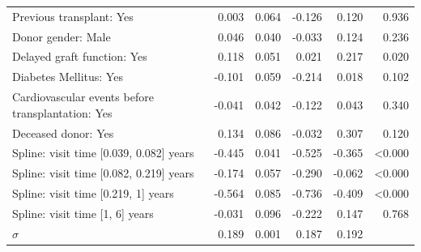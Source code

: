 \begin{table}[!htb]
\begin{center}
\begin{tabular}{lrrrrr}
Previous transplant: Yes                                                                 & 0.003    & 0.064 & -0.126 & 0.120   & 0.936 \\
Donor gender: Male                                                                       & 0.046    & 0.040  & -0.033 & 0.124  & 0.236 \\
Delayed graft function: Yes                                                                       & 0.118    & 0.051 & 0.021  & 0.217  & 0.020  \\
Diabetes Mellitus: Yes                                                                        & -0.101   & 0.059 & -0.214 & 0.018  & 0.102 \\
Cardiovascular events before transplantation: Yes                                                                     & -0.041   & 0.042 & -0.122 & 0.043  & 0.340  \\
Deceased donor: Yes                                                                 & 0.134    & 0.086 & -0.032 & 0.307  & 0.120  \\
Spline: visit time [0.039, 0.082] years & -0.445   & 0.041 & -0.525 & -0.365 & \textless0.000 \\
Spline: visit time [0.082, 0.219] years & -0.174   & 0.057 & -0.290  & -0.062 & \textless0.000 \\
Spline: visit time [0.219, 1] years & -0.564   & 0.085 & -0.736 & -0.409 & \textless0.000 \\
Spline: visit time [1, 6] years & -0.031   & 0.096 & -0.222 & 0.147  & 0.768 \\
$\sigma$                                                                           & 0.189    & 0.001 & 0.187  & 0.192  & \\
\hline
\end{tabular}
\end{center}
\end{table}
